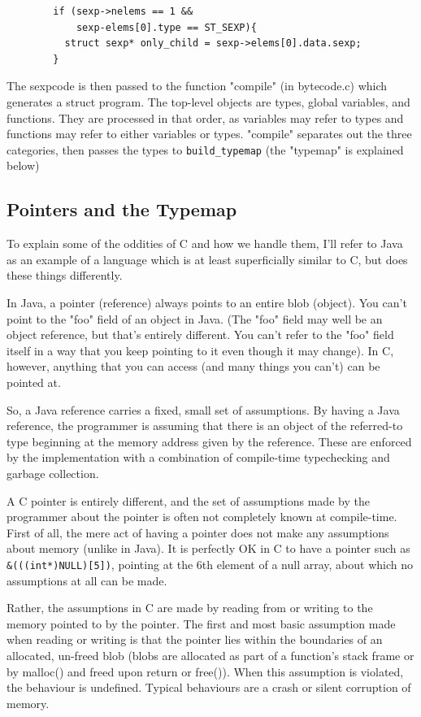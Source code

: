 \documentclass[10pt,a4paper]{report}
\begin{document}
\begin{verbatim}
        if (sexp->nelems == 1 &&
            sexp-elems[0].type == ST_SEXP){
          struct sexp* only_child = sexp->elems[0].data.sexp;
        }
\end{verbatim}

The sexpcode is then passed to the function "compile" (in bytecode.c) which generates a struct program. The top-level objects are types, global variables, and functions. They are processed in that order, as variables may refer to types and functions may refer to either variables or types. "compile" separates out the three categories, then passes the types to \lstinline{build_typemap} (the "typemap" is explained below)


\subsection{Pointers and the Typemap}

To explain some of the oddities of C and how we handle them, I'll refer to Java as an example of a language which is at least superficially similar to C, but does these things differently.

In Java, a pointer (reference) always points to an entire blob (object). You can't point to the "foo" field of an object in Java. (The "foo" field may well be an object reference, but that's entirely different. You can't refer to the "foo" field itself in a way that you keep pointing to it even though it may change). In C, however, anything that you can access (and many things you can't) can be pointed at.

So, a Java reference carries a fixed, small set of assumptions. By having a Java reference, the programmer is assuming that there is an object of the referred-to type beginning at the memory address given by the reference. These are enforced by the implementation with a combination of compile-time typechecking and garbage collection.

A C pointer is entirely different, and the set of assumptions made by the programmer about the pointer is often not completely known at compile-time. First of all, the mere act of having a pointer does not make any assumptions about memory (unlike in Java). It is perfectly OK in C to have a pointer such as \lstinline{&(((int*)NULL)[5])}, pointing at the 6th element of a null array, about which no assumptions at all can be made.

Rather, the assumptions in C are made by reading from or writing to the memory pointed to by the pointer. The first and most basic assumption made when reading or writing is that the pointer lies within the boundaries of an allocated, un-freed blob (blobs are allocated as part of a function's stack frame or by malloc() and freed upon return or free()). When this assumption is violated, the behaviour is undefined. Typical behaviours are a crash or silent corruption of memory.
\end{document}
